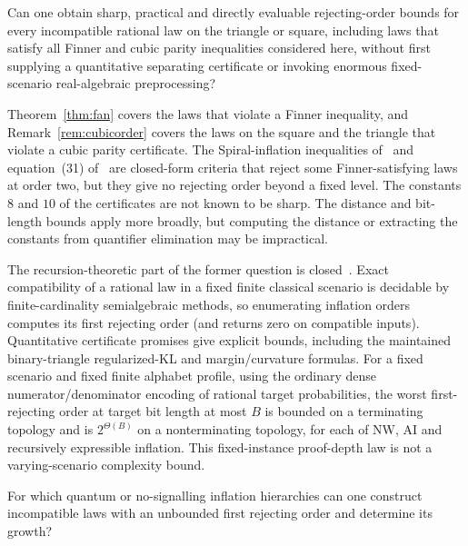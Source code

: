 \begin{question}\label{q:effective}
Can one obtain sharp, practical and directly evaluable rejecting-order bounds
for every incompatible rational law on the triangle or square, including laws
that satisfy all Finner and cubic parity inequalities considered here, without
first supplying a quantitative separating certificate or invoking enormous
fixed-scenario real-algebraic preprocessing?
\end{question}
Theorem~\ref{thm:fan} covers the laws that violate a Finner inequality, and Remark~\ref{rem:cubicorder} covers the laws on the square and the triangle that violate a cubic parity certificate. The Spiral-inflation inequalities of~\cite[Section IV C]{WSF2019} and equation~(31) of~\cite{NW2020} are closed-form criteria that reject some Finner-satisfying laws at order two, but they give no rejecting order beyond a fixed level. The constants $8$ and $10$ of the certificates are not known to be sharp. The distance and bit-length bounds apply more broadly, but computing the distance or extracting the constants from quantifier elimination may be impractical.

The recursion-theoretic part of the former question is
closed~\cite{BlairEffectiveInflation2026}.  Exact
compatibility of a rational law in a fixed finite classical scenario is
decidable by finite-cardinality semialgebraic methods, so enumerating inflation
orders computes its first rejecting order (and returns zero on compatible
inputs).  Quantitative certificate promises give explicit bounds, including
the maintained binary-triangle regularized-KL and margin/curvature formulas.
For a fixed scenario and fixed finite alphabet profile, using the ordinary
dense numerator/denominator encoding of rational target probabilities, the
worst first-rejecting order at target bit length at most $B$ is bounded on a
terminating topology and is $2^{\Theta(B)}$ on a nonterminating topology, for
each of NW, AI and recursively expressible inflation.  This fixed-instance
proof-depth law is not a varying-scenario complexity bound.

\begin{question}\label{q:quantum}
For which quantum or no-signalling inflation hierarchies can one construct incompatible laws with an unbounded first rejecting order and determine its growth?
\end{question}
